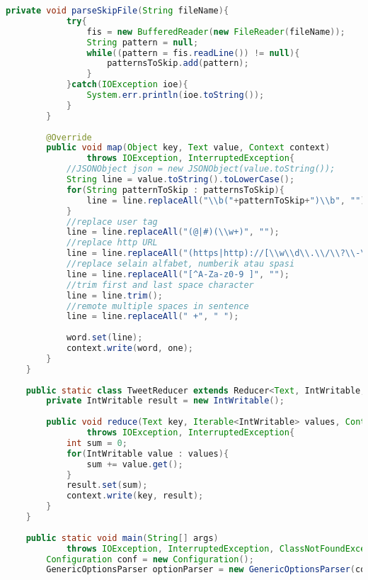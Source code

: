 \begin{lstlisting}[language=Java,basicstyle=\tiny,caption=Stemming.java]
        private void parseSkipFile(String fileName){
            try{
                fis = new BufferedReader(new FileReader(fileName));
                String pattern = null;
                while((pattern = fis.readLine()) != null){
                    patternsToSkip.add(pattern);
                }
            }catch(IOException ioe){
                System.err.println(ioe.toString());
            }
        }
        
        @Override
        public void map(Object key, Text value, Context context) 
                throws IOException, InterruptedException{
            //JSONObject json = new JSONObject(value.toString());
            String line = value.toString().toLowerCase();
            for(String patternToSkip : patternsToSkip){
                line = line.replaceAll("\\b("+patternToSkip+")\\b", "");
            }
            //replace user tag
            line = line.replaceAll("(@|#)(\\w+)", "");
            //replace http URL
            line = line.replaceAll("(https|http)://[\\w\\d\\.\\/\\?\\-\\+%=&#]+", "");
            //replace selain alfabet, numberik atau spasi
            line = line.replaceAll("[^A-Za-z0-9 ]", "");
            //trim first and last space character
            line = line.trim();
            //remote multiple spaces in sentence
            line = line.replaceAll(" +", " ");
            
            word.set(line);
            context.write(word, one);
        }
    }
    
    public static class TweetReducer extends Reducer<Text, IntWritable, Text, IntWritable>{
        private IntWritable result = new IntWritable();
        
        public void reduce(Text key, Iterable<IntWritable> values, Context context) 
                throws IOException, InterruptedException{
            int sum = 0;
            for(IntWritable value : values){
                sum += value.get();
            }
            result.set(sum);
            context.write(key, result);
        }
    }
    
    public static void main(String[] args) 
            throws IOException, InterruptedException, ClassNotFoundException {
        Configuration conf = new Configuration();
        GenericOptionsParser optionParser = new GenericOptionsParser(conf, args);
        

\end{lstlisting}
